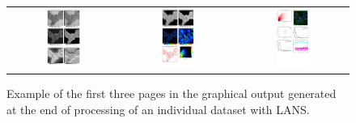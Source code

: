 \begin{figure}[!ht]
\centering
\begin{tabular}{c@{\hskip0mm}c@{\hskip0mm}c}
\includegraphics[width=0.32\textwidth, valign=t]{figs3/outputG1}
&
\includegraphics[width=0.32\textwidth, valign=t]{figs3/outputG2}
&
\includegraphics[width=0.32\textwidth, valign=t]{figs3/outputG3}
\end{tabular}
\caption{\label{fig:outputG}%
Example of the first three pages in the graphical output generated at the end of processing of an individual dataset with LANS.}
\end{figure}

